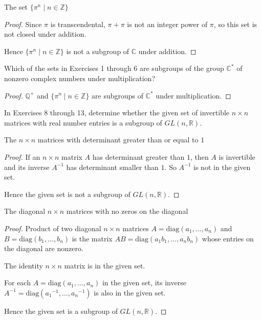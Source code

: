 \begin{exercise}
    The set $\{ \pi^{n} \mid n\in\mathbb{Z} \}$
\end{exercise}

\begin{proof}
    Since $\pi$ is transcendental, $\pi + \pi$ is not an integer power of $\pi$, so this set is not closed under addition.

    Hence $\{ \pi^{n} \mid n\in\mathbb{Z} \}$ is not a subgroup of $\mathbb{C}$ under addition.
\end{proof}

\begin{exercise}
    Which of the sets in Exercises 1 through 6 are subgroups of the group $\mathbb{C}^{*}$ of nonzero complex numbers under multiplication?
\end{exercise}

\begin{proof}
    $\mathbb{Q}^{+}$ and $\{ \pi^{n} \mid n\in\mathbb{Z} \}$ are subgroups of $\mathbb{C}^{*}$ under multiplication.
\end{proof}

In Exercises 8 through 13, determine whether the given set of invertible $n\times n$ matrices with real number entries is a subgroup of $GL(n, \mathbb{R})$.

\begin{exercise}
    The $n\times n$ matrices with determinant greater than or equal to $1$
\end{exercise}

\begin{proof}
    If an $n\times n$ matrix $A$ has determinant greater than $1$, then $A$ is invertible and its inverse $A^{-1}$ has determinant smaller than $1$. So $A^{-1}$ is not in the given set.

    Hence the given set is not a subgroup of $GL(n, \mathbb{R})$.
\end{proof}

\begin{exercise}
    The diagonal $n\times n$ matrices with no zeros on the diagonal
\end{exercise}

\begin{proof}
    Product of two diagonal $n\times n$ matrices $A = \text{diag}(a_{1}, \ldots, a_{n})$ and $B = \text{diag}(b_{1}, \ldots, b_{n})$ is the matrix $AB = \text{diag}(a_{1}b_{1}, \ldots, a_{n}b_{n})$ whose entries on the diagonal are nonzero.

    The identity $n\times n$ matrix is in the given set.

    For each $A = \text{diag}(a_{1}, \ldots, a_{n})$ in the given set, its inverse $A^{-1} = \text{diag}({a_{1}}^{-1}, \ldots, {a_{n}}^{-1})$ is also in the given set.

    Hence the given set is a subgroup of $GL(n, \mathbb{R})$.
\end{proof}

